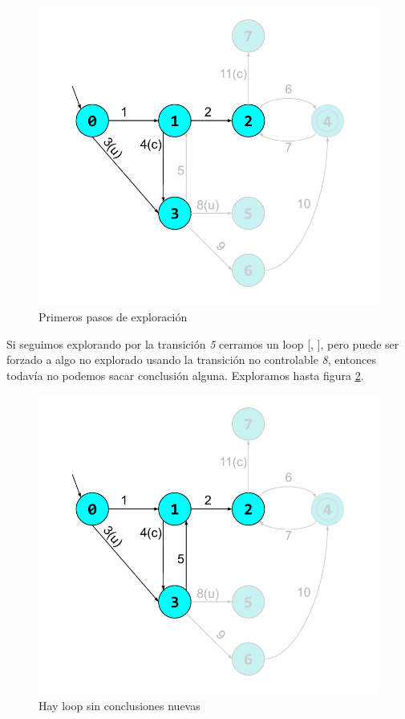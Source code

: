 \begin{figure}[h]
 \centering
 \includegraphics[scale=0.6]{figures/ejemplo_on-the-fly/1.pdf}
 \caption{Primeros pasos de exploración}
 \label{fig:ej:exploracion1}
\end{figure}

Si seguimos explorando por la transición \textit{5} cerramos un loop [, ], pero  puede ser forzado a algo no explorado usando la transición no controlable \textit{8}, entonces todavía no podemos sacar conclusión alguna. Exploramos hasta figura \ref{fig:ej:exploracion2}.

\begin{figure}
 \centering
 \includegraphics[scale=0.6]{figures/ejemplo_on-the-fly/2.pdf}
 \caption{Hay loop sin conclusiones nuevas}
 \label{fig:ej:exploracion2}
\end{figure}

